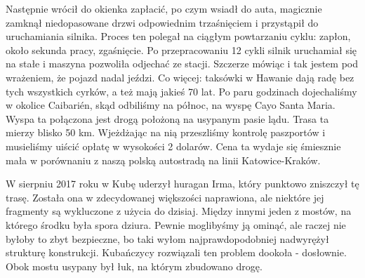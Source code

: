 Następnie wrócił do okienka zapłacić, po czym wsiadł do auta, magicznie zamknął niedopasowane drzwi odpowiednim trzaśnięciem i przystąpił do uruchamiania silnika.
Proces ten polegał na ciągłym powtarzaniu cyklu: zapłon, około sekunda pracy, zgaśnięcie.
Po przepracowaniu 12 cykli silnik uruchamiał się na stałe i maszyna pozwoliła odjechać ze stacji.
Szczerze mówiąc i tak jestem pod wrażeniem, że pojazd nadal jeździ.
Co więcej: taksówki w Hawanie dają radę bez tych wszystkich cyrków, a też mają jakieś 70 lat.
Po paru godzinach dojechaliśmy w okolice Caibarién, skąd odbiliśmy na północ, na wyspę Cayo Santa Maria.
Wyspa ta połączona jest drogą położoną na usypanym pasie lądu.
Trasa ta mierzy blisko 50 km.
Wjeżdżając na nią przeszliśmy kontrolę paszportów i musieliśmy uiścić opłatę w wysokości 2 dolarów.
Cena ta wydaje się śmiesznie mała w porównaniu z naszą polską autostradą na linii Katowice-Kraków.
\par W sierpniu 2017 roku w Kubę uderzył huragan Irma, który punktowo zniszczył tę trasę.
Została ona w zdecydowanej większości naprawiona, ale niektóre jej fragmenty są wykluczone z użycia do dzisiaj.
Między innymi jeden z mostów, na którego środku była spora dziura. Pewnie moglibyśmy ją ominąć, ale raczej nie byłoby to zbyt bezpieczne, bo taki wyłom najprawdopodobniej nadwyrężył strukturę konstrukcji.
Kubańczycy rozwiązali ten problem dookoła - dosłownie.
Obok mostu usypany był łuk, na którym zbudowano drogę.

